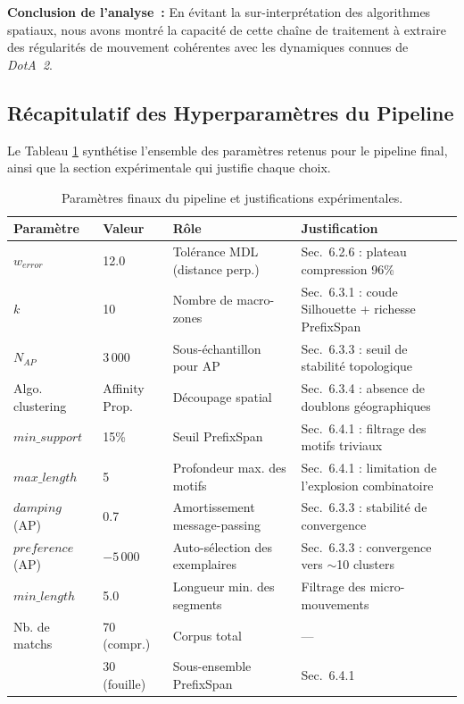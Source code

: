 \documentclass[11pt, a4paper]{article}
\begin{document}
\textbf{Conclusion de l'analyse~:} En évitant la sur-interprétation des algorithmes spatiaux, nous avons montré la capacité de cette chaîne de traitement à extraire des régularités de mouvement cohérentes avec les dynamiques connues de \textit{DotA~2}.

\subsection{Récapitulatif des Hyperparamètres du Pipeline}

Le Tableau \ref{tab:hyperparams} synthétise l'ensemble des paramètres retenus pour le pipeline final, ainsi que la section expérimentale qui justifie chaque choix.

\begin{table}[H]
\centering
\caption{Paramètres finaux du pipeline et justifications expérimentales.}
\label{tab:hyperparams}
\small
\begin{tabularx}{\textwidth}{l l X X}
\toprule
\textbf{Paramètre} & \textbf{Valeur} & \textbf{Rôle} & \textbf{Justification} \\
\midrule
$w_{error}$ & 12.0 & Tolérance MDL (distance perp.) & Sec.~6.2.6 : plateau compression 96\% \\
$k$ & 10 & Nombre de macro-zones & Sec.~6.3.1 : coude Silhouette + richesse PrefixSpan \\
$N_{AP}$ & 3\,000 & Sous-échantillon pour AP & Sec.~6.3.3 : seuil de stabilité topologique \\
Algo. clustering & Affinity Prop. & Découpage spatial & Sec.~6.3.4 : absence de doublons géographiques \\
$min\_support$ & 15\% & Seuil PrefixSpan & Sec.~6.4.1 : filtrage des motifs triviaux \\
$max\_length$ & 5 & Profondeur max. des motifs & Sec.~6.4.1 : limitation de l'explosion combinatoire \\
$damping$ (AP) & 0.7 & Amortissement message-passing & Sec.~6.3.3 : stabilité de convergence \\
$preference$ (AP) & $-5\,000$ & Auto-sélection des exemplaires & Sec.~6.3.3 : convergence vers $\sim$10 clusters \\
$min\_length$ & 5.0 & Longueur min. des segments & Filtrage des micro-mouvements \\
Nb. de matchs & 70 (compr.) & Corpus total & ---  \\
 & 30 (fouille) & Sous-ensemble PrefixSpan & Sec.~6.4.1 \\
\bottomrule
\end{tabularx}
\end{table}
\end{document}
